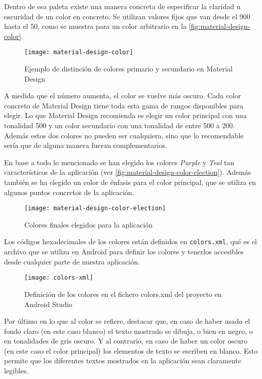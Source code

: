 Dentro de esa paleta existe una manera concreta de especificar la claridad u oscuridad de un color en concreto. Se utilizan valores fijos que van desde el 900 hasta el 50, como se muestra para un color arbitrario en la \autoref{fig:material-design-color}.

\begin{figure}[H]
	\centering
	\texttt{[image: material-design-color]}
	\caption{Ejemplo de distinción de colores primario y secundario en Material Design}
	\label{fig:material-design-color}
\end{figure}

A medida que el número aumenta, el color se vuelve más oscuro. Cada color concreto de Material Design tiene toda esta gama de rangos disponibles para elegir. Lo que Material Design recomienda es elegir un color principal con una tonalidad 500 y un color secundario con una tonalidad de entre 500 a 200. Además estos dos colores no pueden ser cualquiera, sino que lo recomendable sería que de alguna manera fueran complementarios.

En base a todo lo mencionado se han elegido los colores \textit{Purple} y \textit{Teal} tan característicos de la aplicación (ver \autoref{fig:material-design-color-election}). Además también se ha elegido un color de énfasis para el color principal, que se utiliza en algunos puntos concretos de la aplicación.

\begin{figure}[H]
	\centering
	\texttt{[image: material-design-color-election]}
	\caption{Colores finales elegidos para la aplicación}
	\label{fig:material-design-color-election}
\end{figure}

Los códigos hexadecimales de los colores están definidos en \texttt{colors.xml}, qué es el archivo que se utiliza en Android para definir los colores y tenerlos accesibles desde cualquier parte de nuestra aplicación.

\begin{figure}[H]
	\centering
	\texttt{[image: colors-xml]}
	\caption{Definición de los colores en el fichero colors.xml del proyecto en Android Studio}
	\label{fig:colors-xml}
\end{figure}

Por último en lo que al color se refiere, destacar que, en caso de haber usado el fondo claro (en este caso blanco) el texto mostrado se dibuja, o bien en negro, o en tonalidades de gris oscuro. Y al contrario, en caso de haber un color oscuro (en este caso el color principal) los elementos de texto se escriben en blanco. Esto permite que los diferentes textos mostrados en la aplicación sean claramente legibles.

